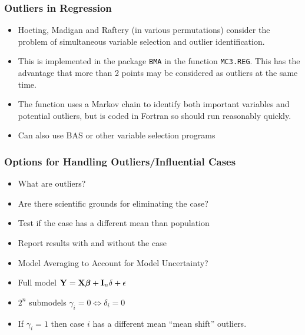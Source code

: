 \documentclass[]{beamer}
\begin{document}
  \begin{frame} \frametitle{Outliers in Regression}
    \begin{itemize}
    \item Hoeting, Madigan and Raftery (in various permutations)
      consider the problem of simultaneous variable selection and
      outlier identification. \pause
\item   This is implemented in the package {\tt BMA} in the function
  {\tt MC3.REG}.
This has the advantage that more than 2 points may be considered as
outliers at the same time. \pause
\item The function uses a Markov chain to identify both important
  variables and potential outliers, but is coded in Fortran so should
  run reasonably quickly. \pause
\item Can also use BAS or other variable selection programs \pause
  \end{itemize}
  \end{frame}




\begin{frame} \frametitle{Options for Handling Outliers/Influential Cases}
\begin{itemize}
\item What are outliers? \pause
\item Are there scientific grounds for eliminating the case? \pause
\item Test if the case  has a different mean than population \pause
\item Report results with and without the case \pause
\item Model Averaging to Account for Model Uncertainty?  \pause

\item Full model $\mathbf{Y} = \mathbf{X} \boldsymbol{\beta} + \mathbf{I}_n\delta + \epsilon$ \pause
\item $2^n$ submodels $\gamma_i = 0 \Leftrightarrow \delta_i = 0$
\item If $\gamma_i = 1$ then case $i$ has a different mean ``mean
  shift'' outliers.
\end{itemize}

\end{frame}
\end{document}
